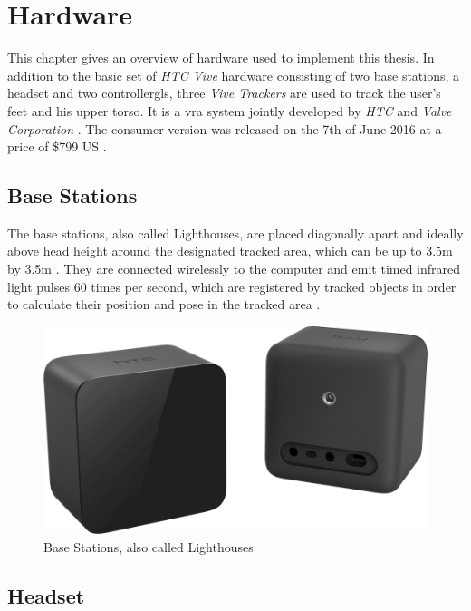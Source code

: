 
\chapter{Hardware}\label{chapter:Hardware}

This chapter gives an overview of hardware used to implement this thesis. In addition to the basic set of \textit{HTC Vive} hardware consisting of two base stations, a headset and two \glspl{controllergl},  three \textit{Vive Trackers} are used to track the user's feet and his upper torso. It is a \gls{vra} system jointly developed by \textit{HTC} and \textit{Valve Corporation} \autocite{htcValveVive}. The consumer version was released on the 7th of June 2016 at a price of \$799 US \autocite{htcShip}.


\section{Base Stations}

The base stations, also called Lighthouses, are placed diagonally apart and ideally above head height around the designated tracked area, which can be up to 3.5m by 3.5m \autocite{viveProductPage}. They are connected wirelessly to the computer and emit timed infrared light pulses 60 times per second, which are registered by tracked objects in order to calculate their position and pose in the tracked area \autocite{lighthouseHowWork}.
\begin{figure}[h]
    \centering
    \includegraphics[height=0.2\textheight]{figures/vive-hardware-base-stations.png}
    \caption{Base Stations, also called Lighthouses \autocite{viveProductPage}}
    \label{fig:lighthouse}
\end{figure}


\section{Headset}

